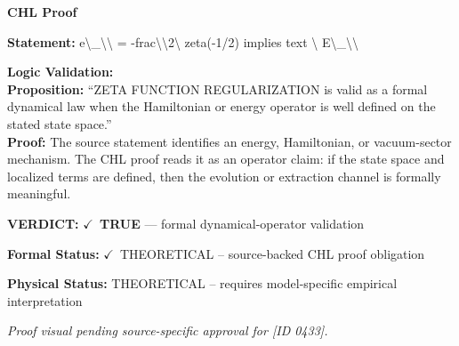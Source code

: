 \vspace{0.45em}
\noindent\textbf{CHL Proof}\par
\textbf{Statement:} e\textbackslash{}\_\textbackslash{}\textbackslash{} = -frac\textbackslash{}\textbackslash{}2\textbackslash{} zeta(-1/2) implies text \textbackslash{} E\textbackslash{}\_\textbackslash{}\textbackslash{}

\textbf{Logic Validation:}\\
\textbf{Proposition:} ``ZETA FUNCTION REGULARIZATION is valid as a formal dynamical law when the Hamiltonian or
energy operator is well defined on the stated state space.''\\
\textbf{Proof:} The source statement identifies an energy, Hamiltonian, or vacuum-sector mechanism. The
CHL proof reads it as an operator claim: if the state space and localized terms are
defined, then the evolution or extraction channel is formally meaningful.

\textbf{VERDICT:} \ensuremath{\checkmark}\ \textbf{TRUE} --- formal dynamical-operator validation

\textbf{Formal Status:} \ensuremath{\checkmark}\ THEORETICAL -- source-backed CHL proof obligation

\textbf{Physical Status:} THEORETICAL -- requires model-specific empirical interpretation
\par\vspace{0.45em}
\par
\vfill
\begingroup\footnotesize\itshape
Proof visual pending source-specific approval for [ID 0433].
\par\endgroup
\vfill
\endgroup
\endgroup
